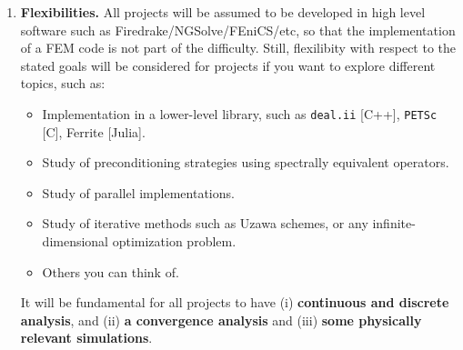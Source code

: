 \documentclass{article}
\begin{document}
\begin{enumerate}
    \item \textbf{Flexibilities. } All projects will be assumed to be developed in high level software such as Firedrake/NGSolve/FEniCS/etc, so that the implementation of a FEM code is not part of the difficulty. Still, flexilibity with respect to the stated goals will be considered for projects if you want to explore different topics, such as: 
        \begin{itemize}
            \item Implementation in a lower-level library, such as \texttt{deal.ii} [C++], \texttt{PETSc} [C], Ferrite [Julia].
            \item Study of preconditioning strategies using spectrally equivalent operators.
            \item Study of parallel implementations.
            \item Study of iterative methods such as Uzawa schemes, or any infinite-dimensional optimization problem.
            \item Others you can think of.
        \end{itemize}
    It will be fundamental for all projects to have (i) \textbf{continuous and discrete analysis}, and (ii) \textbf{a convergence analysis} and (iii) \textbf{some physically relevant simulations}.
\end{enumerate}
\end{document}

